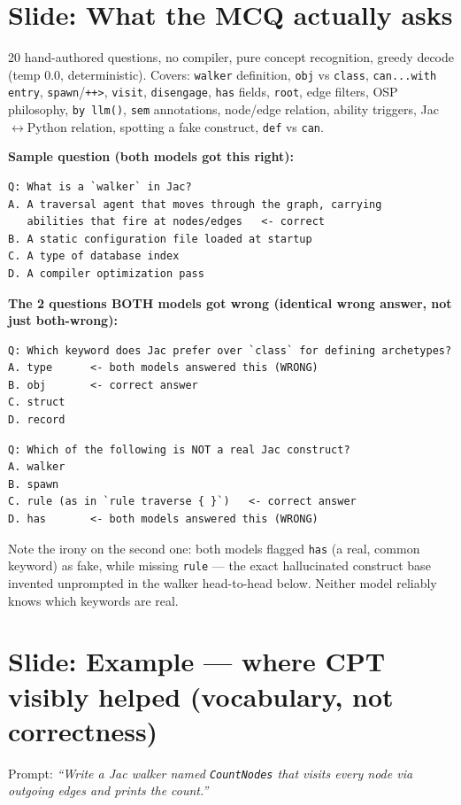 \documentclass[11pt]{article}
\begin{document}
\section{Slide: What the MCQ actually asks}
20 hand-authored questions, no compiler, pure concept recognition, greedy decode (temp 0.0, deterministic). Covers: \texttt{walker} definition, \texttt{obj} vs \texttt{class}, \texttt{can...with entry}, \texttt{spawn}/\texttt{++>}, \texttt{visit}, \texttt{disengage}, \texttt{has} fields, \texttt{root}, edge filters, OSP philosophy, \texttt{by llm()}, \texttt{sem} annotations, node/edge relation, ability triggers, Jac$\leftrightarrow$Python relation, spotting a fake construct, \texttt{def} vs \texttt{can}.

\textbf{Sample question (both models got this right):}
\begin{lstlisting}
Q: What is a `walker` in Jac?
A. A traversal agent that moves through the graph, carrying
   abilities that fire at nodes/edges   <- correct
B. A static configuration file loaded at startup
C. A type of database index
D. A compiler optimization pass
\end{lstlisting}

\textbf{The 2 questions BOTH models got wrong (identical wrong answer, not just both-wrong):}

\begin{lstlisting}
Q: Which keyword does Jac prefer over `class` for defining archetypes?
A. type      <- both models answered this (WRONG)
B. obj       <- correct answer
C. struct
D. record
\end{lstlisting}

\begin{lstlisting}
Q: Which of the following is NOT a real Jac construct?
A. walker
B. spawn
C. rule (as in `rule traverse { }`)   <- correct answer
D. has       <- both models answered this (WRONG)
\end{lstlisting}

Note the irony on the second one: both models flagged \texttt{has} (a real, common keyword) as fake, while missing \texttt{rule} — the exact hallucinated construct base invented unprompted in the walker head-to-head below. Neither model reliably knows which keywords are real.

\section{Slide: Example — where CPT visibly helped (vocabulary, not correctness)}
Prompt: \emph{``Write a Jac walker named \texttt{CountNodes} that visits every node via outgoing edges and prints the count.''}
\end{document}
